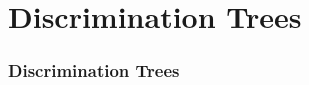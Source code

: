 
\section{Discrimination Trees}

\begin{frame}
	\frametitle{Discrimination Trees}
	
\end{frame}

\begin{frame}
	
\end{frame}